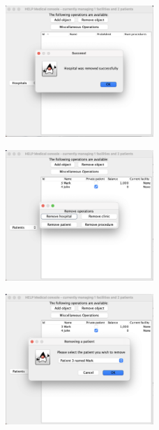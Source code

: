 \documentclass{article}
\begin{document}
\begin{figure}
  \begin{center}
  \includegraphics[width=0.5\textwidth]{./figures/Remove/Hospital_4.png}
  \end{center}
\end{figure}

\begin{figure}
  \begin{center}
  \includegraphics[width=0.5\textwidth]{./figures/Remove/Patient_1.png}
  \end{center}
\end{figure}

\begin{figure}
  \begin{center}
  \includegraphics[width=0.5\textwidth]{./figures/Remove/Patient_2.png}
  \end{center}
\end{figure}
\end{document}
